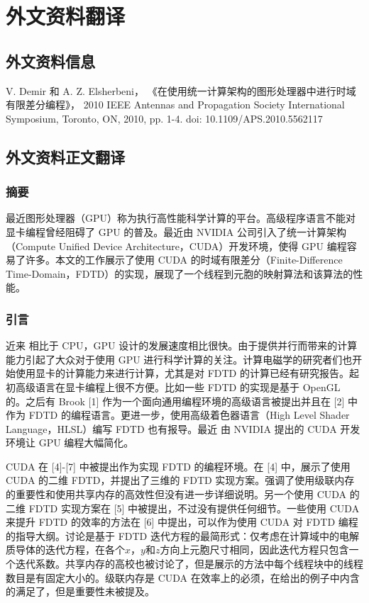 
\chapter{外文资料翻译}

\section{外文资料信息}

V. Demir 和 A. Z. Elsherbeni， 《在使用统一计算架构的图形处理器中进行时域有限差分编程》， 2010 IEEE Antennas and Propagation Society International Symposium, Toronto, ON, 2010, pp. 1-4. doi: 10.1109/APS.2010.5562117

\section{外文资料正文翻译}

\subsection{摘要}

最近图形处理器（GPU）称为执行高性能科学计算的平台。高级程序语言不能对显卡编程曾经阻碍了 GPU 的普及。最近由 NVIDIA 公司引入了统一计算架构（Compute Unified Device Architecture，CUDA）开发环境，使得 GPU 编程容易了许多。本文的工作展示了使用 CUDA 的时域有限差分（Finite-Difference Time-Domain，FDTD）的实现，展现了一个线程到元胞的映射算法和该算法的性能。

\subsection{引言}

近来 相比于 CPU，GPU 设计的发展速度相比很快。由于提供并行而带来的计算能力引起了大众对于使用 GPU 进行科学计算的关注。计算电磁学的研究者们也开始使用显卡的计算能力来进行计算，尤其是对 FDTD 的计算已经有研究报告。起初高级语言在显卡编程上很不方便。比如一些 FDTD 的实现是基于 OpenGL 的。之后有 Brook [1] 作为一个面向通用编程环境的高级语言被提出并且在 [2] 中作为 FDTD 的编程语言。更进一步，使用高级着色器语言（High Level Shader Language，HLSL）编写 FDTD 也有报导。最近 由 NVIDIA 提出的 CUDA 开发环境让 GPU 编程大幅简化。

CUDA 在 [4]-[7] 中被提出作为实现 FDTD 的编程环境。在 [4] 中，展示了使用 CUDA 的二维 FDTD，并提出了三维的 FDTD 实现方案。强调了使用级联内存的重要性和使用共享内存的高效性但没有进一步详细说明。另一个使用 CUDA 的二维 FDTD 实现方案在 [5] 中被提出，不过没有提供任何细节。一些使用 CUDA 来提升 FDTD 的效率的方法在 [6] 中提出，可以作为使用 CUDA 对 FDTD 编程的指导大纲。讨论是基于 FDTD 迭代方程的最简形式：仅考虑在计算域中的电解质导体的迭代方程，在各个$x$，$y$和$z$方向上元胞尺寸相同，因此迭代方程只包含一个迭代系数。共享内存的高校也被讨论了，但是展示的方法中每个线程块中的线程数目是有固定大小的。级联内存是 CUDA 在效率上的必须，在给出的例子中内含的满足了，但是重要性未被提及。

